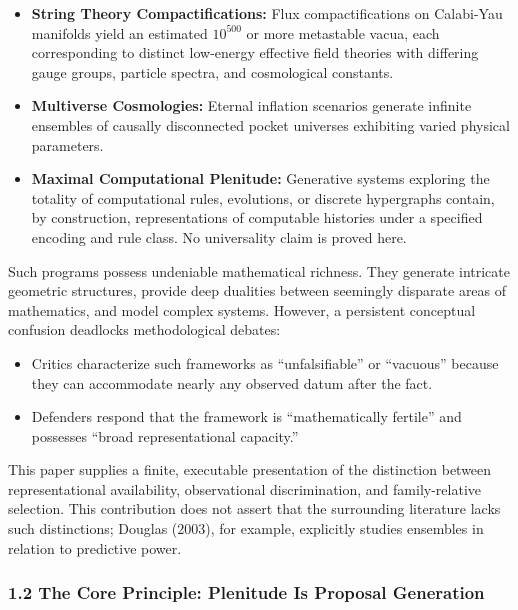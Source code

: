 \documentclass[
  10pt,
]{article}
\begin{document}
\begin{itemize}
\item
  \textbf{String Theory Compactifications:} Flux compactifications on Calabi-Yau manifolds yield an estimated \hypertarget{math-E0009-0001}{}{\(10^{500}\)} or more metastable vacua, each corresponding to distinct low-energy effective field theories with differing gauge groups, particle spectra, and cosmological constants.
\item
  \textbf{Multiverse Cosmologies:} Eternal inflation scenarios generate infinite ensembles of causally disconnected pocket universes exhibiting varied physical parameters.
\item
  \textbf{Maximal Computational Plenitude:} Generative systems exploring the totality of computational rules, evolutions, or discrete hypergraphs contain, by construction, representations of computable histories under a specified encoding and rule class. No universality claim is proved here.
\end{itemize}

Such programs possess undeniable mathematical richness. They generate intricate geometric structures, provide deep dualities between seemingly disparate areas of mathematics, and model complex systems. However, a persistent conceptual confusion deadlocks methodological debates:

\begin{itemize}
\item
  Critics characterize such frameworks as ``unfalsifiable'' or ``vacuous'' because they can accommodate nearly any observed datum after the fact.
\item
  Defenders respond that the framework is ``mathematically fertile'' and possesses ``broad representational capacity.''
\end{itemize}

This paper supplies a finite, executable presentation of the distinction between representational availability, observational discrimination, and family-relative selection. This contribution does not assert that the surrounding literature lacks such distinctions; Douglas (2003), for example, explicitly studies ensembles in relation to predictive power.

\subsubsection{1.2 The Core Principle: Plenitude Is Proposal Generation}\label{the-core-principle-plenitude-is-proposal-generation}
\end{document}
